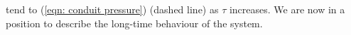 \documentclass{jfm}
\newcommand{\note}[1]{{\color{Ncolour} \fontsize{14}{16.8}\selectfont \textbf{#1}}}
\begin{document}
 tend to  (\ref{eqn:  conduit  pressure}) (dashed line) as $\tau $ increases.
We are now in a position to describe the long-time behaviour of the system. 


\end{document}
